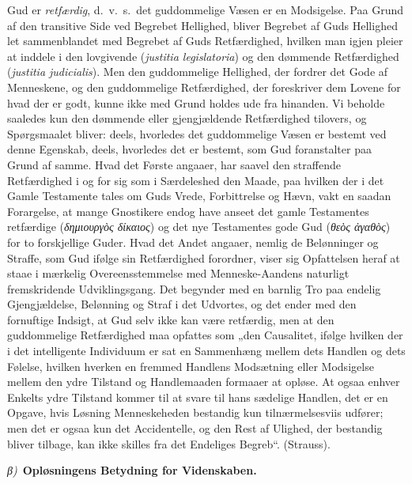 \documentclass[12pt]{book}
\newcommand{\greekrun}[2]{%
  \medskip\begin{center}{\itshape #1)}\ {\bfseries #2}\end{center}\medskip}
\begin{document}
Gud er \emph{retfærdig}, d.\ v.\ s.\ det guddommelige Væsen er en
Modsigelse. Paa Grund af den transitive Side ved Begrebet Hellighed,
bliver Begrebet af Guds Hellighed let sammenblandet med Begrebet af
Guds Retfærdighed, hvilken man igjen pleier at inddele i den
lovgivende (\textit{justitia legislatoria}) og den dømmende
Retfærdighed (\textit{justitia judicialis}). Men den guddommelige
Hellighed, der fordrer det Gode af Menneskene, og den guddommelige
Retfærdighed, der foreskriver dem Lovene for hvad der er godt, kunne
ikke med Grund holdes ude fra hinanden. Vi beholde saaledes kun den
dømmende eller gjengjældende Retfærdighed tilovers, og Spørgsmaalet
bliver: deels, hvorledes det guddommelige Væsen er bestemt ved denne
Egenskab, deels, hvorledes det er bestemt, som Gud foranstalter paa
Grund af samme. Hvad det Første angaaer, har saavel den straffende
Retfærdighed i og for sig som i Særdeleshed den Maade, paa hvilken
der i det Gamle Testamente tales om Guds Vrede, Forbittrelse og
Hævn,
vakt en saadan Forargelse, at mange Gnostikere endog have anseet det
gamle Testamentes retfærdige (\textit{δημιουργὸς δίκαιος}) og det
nye Testamentes gode Gud (\textit{θεὸς ἀγαθὸς}) for to
forskjellige Guder. Hvad det Andet angaaer, nemlig de Belønninger og
Straffe, som Gud ifølge sin Retfærdighed forordner, viser sig
Opfattelsen heraf at staae i mærkelig Overeensstemmelse med
Menneske-Aandens naturligt fremskridende Udviklingsgang. Det
begynder med en barnlig Tro paa endelig Gjengjældelse, Belønning og
Straf i det Udvortes, og det ender med den fornuftige Indsigt, at
Gud selv ikke kan være retfærdig, men at den guddommelige
Retfærdighed maa opfattes som „den Causalitet, ifølge hvilken der i
det intelligente Individuum er sat en Sammenhæng mellem dets Handlen
og dets Følelse, hvilken hverken en fremmed Handlens Modsætning
eller Modsigelse mellem den ydre Tilstand og Handlemaaden formaaer
at opløse. At ogsaa enhver Enkelts ydre Tilstand kommer til at svare
til hans sædelige Handlen, det er en Opgave, hvis Løsning
Menneskeheden bestandig kun tilnærmelsesviis udfører; men det er
ogsaa kun det Accidentelle, og den Rest af Ulighed, der bestandig
bliver tilbage, kan ikke skilles fra det Endeliges Begreb“.
(Strauss).

\greekrun{β}{Opløsningens Betydning for Videnskaben.}
\end{document}
